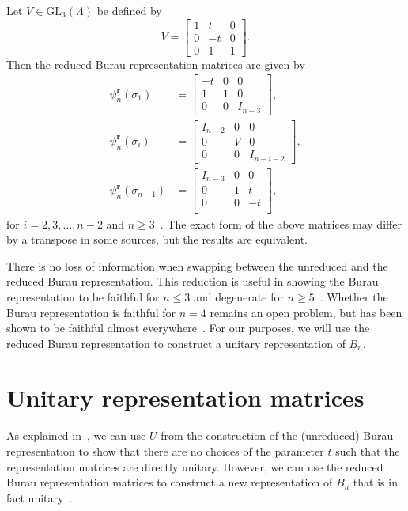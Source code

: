 Let $V\in\textrm{GL}_{3}(\Lambda)$ be defined by
\begin{equation}
    V = \begin{bmatrix}
        1 & t & 0 \\
        0 & -t & 0 \\
        0 & 1 & 1
    \end{bmatrix}.
\end{equation}
Then the reduced Burau representation matrices are given by
\begin{align}
    \psi_n^\textbf{r}(\sigma_1) &= \begin{bmatrix}
        -t & 0 & 0 \\
        1 & 1 & 0 \\
        0 & 0 & I_{n-3}
    \end{bmatrix}, \\
    \psi_n^\textbf{r}(\sigma_i) &= \begin{bmatrix}
        I_{n-2} & 0 & 0 \\
        0 & V & 0 \\
        0 & 0 & I_{n-i-2}
    \end{bmatrix}, \\
    \psi_n^\textbf{r}(\sigma_{n-1}) &= \begin{bmatrix}
        I_{n-3} & 0 & 0 \\
        0 & 1 & t \\
        0 & 0 & -t \\
    \end{bmatrix},
\end{align}
for $i=2,3,\dots,n-2$ and $n\geq 3$~\cite{Kassel2008}. The exact form of the above matrices may differ by a transpose in some sources, but the results are equivalent.

There is no loss of information when swapping between the unreduced and the reduced Burau representation. This reduction is useful in showing the Burau representation to be faithful for $n\leq 3$ and degenerate for $n \geq 5$~\cite{Kassel2008}. Whether the Burau representation is faithful for $n=4$ remains an open problem, but has been shown to be faithful almost everywhere~\cite{Datta2022}. For our purposes, we will use the reduced Burau representation to construct a unitary representation of $B_n$.

\section{Unitary representation matrices}
As explained in~\cite{Delaney2016}, we can use $U$ from the construction of the (unreduced) Burau representation to show that there are no choices of the parameter $t$ such that the representation matrices are directly unitary. However, we can use the reduced Burau representation matrices to construct a new representation of $B_n$ that is in fact unitary~\cite{Delaney2016,Squier1984}.

